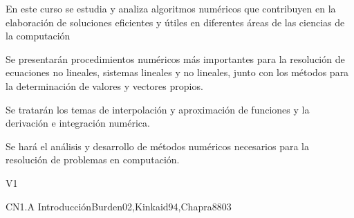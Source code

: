 
\begin{syllabus}


\begin{justification}
En este curso se estudia y analiza algoritmos numéricos que
contribuyen en la elaboración de soluciones eficientes y útiles en
diferentes áreas de las ciencias de la computación
\end{justification}

\begin{goals}
\item Se presentarán procedimientos numéricos más importantes para la resolución de 
ecuaciones no lineales, sistemas lineales y no lineales, junto con los métodos 
para la determinación de valores y vectores propios.

\item Se tratarán los temas de interpolación y aproximación de funciones y la 
derivación e integración numérica.

\item Se hará el análisis y desarrollo de métodos numéricos necesarios para la 
resolución de problemas en computación.
\end{goals}

\begin{outcomes}{V1}
\end{outcomes}

\begin{unit}{CN1.A Introducción}{}{Burden02,Kinkaid94,Chapra88}{0}{3}
\begin{topics}
      \item \CNONETopicFloating
      \item \CNONETopicError
      \item \CNONETopicTaylor
   \end{topics}

   \begin{learningoutcomes}
      \item \CNONEObjONE
      \item \CNONEObjTWO
      \item \CNONEObjTHREE
      \item \CNONEObjFOUR
   \end{learningoutcomes}
\end{unit}


\end{syllabus}
